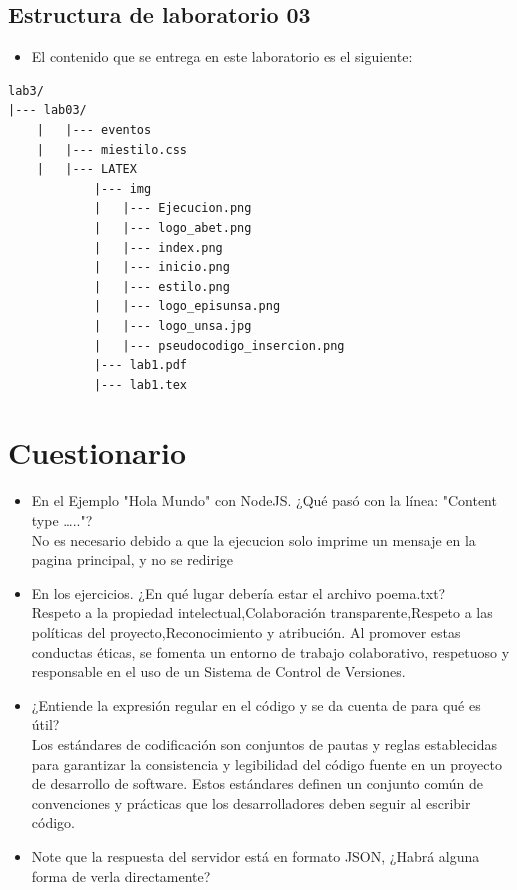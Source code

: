 \documentclass{article}
\begin{document}
\begin{itemize}
	\subsection{Estructura de laboratorio 03}
	\begin{itemize}	
		\item El contenido que se entrega en este laboratorio es el siguiente:
	\end{itemize}
	
\begin{lstlisting}[style=ascii-tree]
lab3/
|--- lab03/
    |   |--- eventos
    |   |--- miestilo.css
    |   |--- LATEX
            |--- img
            |   |--- Ejecucion.png
            |   |--- logo_abet.png
            |   |--- index.png
            |   |--- inicio.png
            |   |--- estilo.png
            |   |--- logo_episunsa.png
            |   |--- logo_unsa.jpg
            |   |--- pseudocodigo_insercion.png    
            |--- lab1.pdf    
            |--- lab1.tex
\end{lstlisting}    

\section{Cuestionario}
	\begin{itemize}
		\item En el Ejemplo "Hola Mundo" con NodeJS. ¿Qué pasó con la línea: "Content type ….."?
        \\ No es necesario debido a que la ejecucion solo imprime un mensaje en la pagina principal, y no se redirige 
        \item En los ejercicios. ¿En qué lugar debería estar el archivo poema.txt?
        \\ Respeto a la propiedad intelectual,Colaboración transparente,Respeto a las políticas del proyecto,Reconocimiento y atribución. Al promover estas conductas éticas, se fomenta un entorno de trabajo colaborativo, respetuoso y responsable en el uso de un Sistema de Control de Versiones.
        \item ¿Entiende la expresión regular en el código y se da cuenta de para qué es útil?
        \\Los estándares de codificación son conjuntos de pautas y reglas establecidas para garantizar la consistencia y legibilidad del código fuente en un proyecto de desarrollo de software. Estos estándares definen un conjunto común de convenciones y prácticas que los desarrolladores deben seguir al escribir código.
        \item Note que la respuesta del servidor está en formato JSON, ¿Habrá alguna forma de verla directamente?
        

\end{itemize}
\end{itemize}
\end{document}
